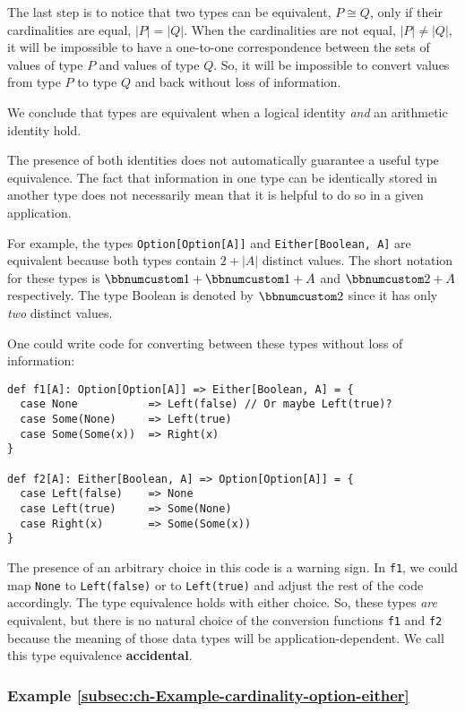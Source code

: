 The last step is to notice that two types can be equivalent, $P\cong Q$,
only if their cardinalities are equal, $\left|P\right|=\left|Q\right|$.
When the cardinalities are not equal, $\left|P\right|\neq\left|Q\right|$,
it will be impossible to have a one-to-one correspondence between
the sets of values of type $P$ and values of type $Q$. So, it will
be impossible to convert values from type $P$ to type $Q$ and back
without loss of information.

We conclude that types are equivalent when a logical identity \emph{and}
an arithmetic identity hold.

The presence of both identities does not automatically guarantee a
useful type equivalence. The fact that information in one type can
be identically stored in another type does not necessarily mean that
it is helpful to do so in a given application.

For example, the types \lstinline!Option[Option[A]]! and \lstinline!Either[Boolean, A]!
are equivalent because both types contain $2+\left|A\right|$ distinct
values. The short notation for these types is $\bbnum 1+\bbnum 1+A$
and $\bbnum 2+A$ respectively. The type Boolean is denoted by $\bbnum 2$
since it has only \emph{two} distinct values. 

One could write code for converting between these types without loss
of information:
\begin{lstlisting}
def f1[A]: Option[Option[A]] => Either[Boolean, A] = {
  case None           => Left(false) // Or maybe Left(true)?
  case Some(None)     => Left(true)
  case Some(Some(x))  => Right(x)
}

def f2[A]: Either[Boolean, A] => Option[Option[A]] = {
  case Left(false)    => None
  case Left(true)     => Some(None)
  case Right(x)       => Some(Some(x))
}
\end{lstlisting}
The presence of an arbitrary choice in this code is a warning sign.
In \lstinline!f1!, we could map \lstinline!None! to \lstinline!Left(false)!
or to \lstinline!Left(true)! and adjust the rest of the code accordingly.
The type equivalence holds with either choice. So, these types \emph{are}
equivalent, but there is no natural choice of the conversion functions
\lstinline!f1! and \lstinline!f2! because the meaning of those data
types will be application-dependent. We call this type equivalence
\textbf{accidental}.

\subsubsection{Example \label{subsec:ch-Example-cardinality-option-either}\ref{subsec:ch-Example-cardinality-option-either}}

